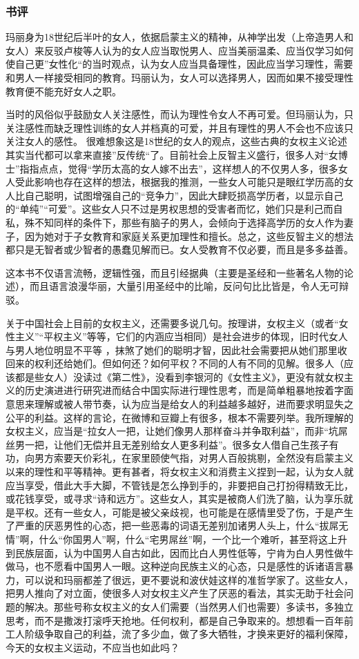 \subsubsection{书评}

玛丽身为18世纪后半叶的女人，依据启蒙主义的精神，从神学出发（上帝造男人和女人）来反驳卢梭等人认为的女人应当取悦男人、应当美丽温柔、应当仅学习如何使自己更”女性化“的当时观点，认为女人应当具备理性，因此应当学习理性，需要和男人一样接受相同的教育。玛丽认为，女人可以选择男人，因而如果不接受理性教育便不能充好女人之职。
 
当时的风俗似乎鼓励女人关注感性，而认为理性令女人不再可爱。但玛丽认为，只关注感性而缺乏理性训练的女人并档真的可爱，并且有理性的男人不会也不应该只关注女人的感性。 
很难想象这是18世纪的女人的观点，这些古典的女权主义论述其实当代都可以拿来直接”反传统“了。目前社会上反智主义盛行，很多人对“女博士”指指点点，觉得“学历太高的女人嫁不出去”，这样想人的不仅男人多，很多女人受此影响也存在这样的想法，根据我的推测，一些女人可能只是眼红学历高的女人比自己聪明，试图增强自己的“竞争力”，因此大肆贬损高学历者，以显示自己的“单纯”“可爱”。这些女人只不过是男权思想的受害者而忆，她们只是利己而自私，殊不知同样的条件下，那些有脑子的男人，会倾向于选择高学历的女人作为妻子，因为她对于子女教育和家庭关系更加理性和擅长。总之，这些反智主义的想法都只是无智者或少智者的愚蠢见解而已。女人受教育不仅必要，而且是多多益善。 

这本书不仅语言流畅，逻辑性强，而且引经据典（主要是圣经和一些著名人物的论述），而且语言浪漫华丽，大量引用圣经中的比喻，反问句比比皆是，令人无可辩驳。

关于中国社会上目前的女权主义，还需要多说几句。按理讲，女权主义（或者“女性主义”“平权主义”等等，它们的内涵应当相同）是社会进步的体现，旧时代女人与男人地位明显不平等 ，抹煞了她们的聪明才智，因此社会需要把从她们那里收回来的权利还给她们。但如何还？如何平权？不同的人有不同的见解。很多人（应该都是些女人）没读过《第二性》，没看到李银河的《女性主义》，更没有就女权主义的历史演进进行研究进而结合中国实际进行理性思考，而是简单粗暴地按着字面意思来理解或被人带节奏，认为应当是给女人的利益越多越好，进而要求明显失之公平的利益。这样的言论，在微博和豆瓣上有很多，根本不需要列举。我所理解的女权主义，应当是“拉女人一把，让她们像男人那样奋斗并争取利益”，而非“坑屌丝男一把，让他们无偿并且无差别给女人更多利益”。很多女人借自己生孩子有功，向男方索要天价彩礼，在家里颐使气指，对男人百般挑剔，全然没有启蒙主义以来的理性和平等精神。更有甚者，将女权主义和消费主义捏到一起，认为女人就应当享受，借此大手大脚，不管钱是怎么挣到手的，非要把自己打扮得精致无比，或花钱享受，或寻求“诗和远方”。这些女人，其实是被商人们洗了脑，认为享乐就是平权。还有一些女人，可能是被父亲歧视，也可能是在感情里受了伤，于是产生了严重的厌恶男性的心态，把一些恶毒的词语无差别加诸男人头上，什么“拔屌无情”啊，什么“你国男人”啊，什么“宅男屌丝”啊，一个比一个难听，甚至将这上升到民族层面，认为中国男人自古如此，因而比白人男性低等，宁肯为白人男性做牛做马，也不愿看中国男人一眼。这种逆向民族主义的心态，只是感性的诉诸语言暴力，可以说和玛丽都差了很远，更不要说和波伏娃这样的准哲学家了。这些女人，把男人推向了对立面，使很多人对女权主义产生了厌恶的看法，其实无助于社会问题的解决。那些号称女权主义的女人们需要（当然男人们也需要）多读书，多独立思考，而不是撒泼打滚呼天抢地。任何权利，都是自己争取来的。想想看一百年前工人阶级争取自己的利益，流了多少血，做了多大牺牲，才换来更好的福利保障，今天的女权主义运动，不应当也如此吗？

